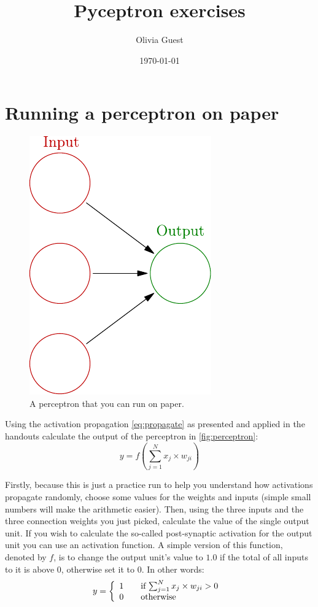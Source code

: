 \documentclass[a4paper,10pt]{article}
\title{Pyceptron exercises}
\author{Olivia Guest}
\date{\today}
\begin{document}
\maketitle
\section{Running a perceptron on paper}
\begin{figure}[hb]
 \centering
 \includegraphics{../slides/fig/perceptron_empty.pdf}
 \caption{A perceptron that you can run on paper.}
 \label{fig:perceptron}
\end{figure}
Using the activation propagation \autoref{eq:propagate} as presented and applied in the handouts calculate the output of the perceptron in \autoref{fig:perceptron}:
\begin{equation}
\label{eq:propagate}
y = f\left(  \sum_{j=1}^N x_j \times w_{ji} \right)
\end{equation}

Firstly, because this is just a practice run to help you understand how activations propagate randomly, choose some values for the weights and inputs (simple small numbers will make the arithmetic easier). Then, using the three inputs and the three connection weights you just picked, calculate the value of the single output unit. If you wish to calculate the so-called post-synaptic activation for the output unit you can use an activation function. A simple version of this function, denoted by $f$, is to change the output unit's value to $1.0$ if the total of all inputs to it is above $0$, otherwise set it to $0$. In other words:
\begin{equation}
\label{eq:f}
  y = \left\{ 
  \begin{array}{l l}
    1 & \quad \text{if $ \sum_{j=1}^N x_j \times w_{ji} > 0$ }\\
    0 & \quad \text{otherwise}\\
  \end{array} \right.
\end{equation}
\end{document}
